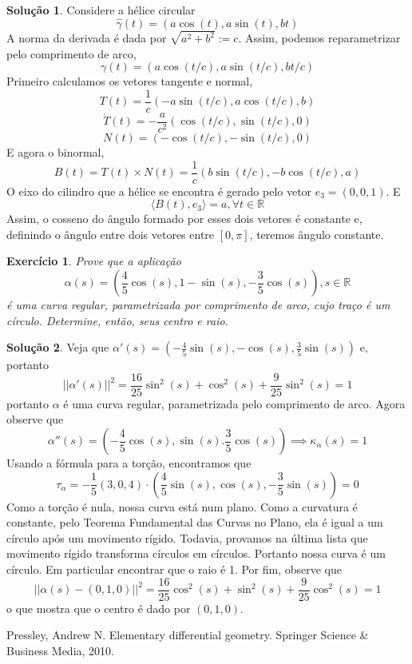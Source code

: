 \documentclass[a4paper,12pt]{article}
\newcommand{\R}{\mathbb{R}}
\theoremstyle{exer}
\newtheorem{exercise}{Exercício}
\theoremstyle{definition}
\newtheorem{solution}{Solução}
\theoremstyle{plain}
\begin{document}
\begin{solution}
    Considere a hélice circular 
    $$
    \hat{\gamma}(t) = (a\cos(t), a\sin(t), bt)
    $$
    A norma da derivada é dada por $\sqrt{a^2 + b^2} := c$. Assim, podemos
    reparametrizar pelo comprimento de arco, 
    $$
    \gamma(t) = (a\cos(t/c), a\sin(t/c), bt/c)
    $$
    Primeiro calculamos os vetores tangente e normal,
    $$
    T(t) = \frac{1}{c}(-a\sin(t/c), a\cos(t/c), b)
    $$
    $$
    \dot{T}(t) = -\frac{a}{c^2}(\cos(t/c), \sin(t/c), 0)
    $$
    $$
    N(t) =  (-\cos(t/c), -\sin(t/c), 0)
    $$
    E agora o binormal, 
    $$
    B(t) = T(t) \times N(t) = \frac{1}{c}(b\sin(t/c), -b\cos(t/c), a) 
    $$
    O eixo do cilindro que a hélice se encontra é gerado pelo vetor $e_3 =
    (0,0,1)$. E 
    $$
    \langle B(t), e_3 \rangle = a, \forall t \in \R 
    $$
    Assim, o cosseno do ângulo formado por esses dois vetores é constante e,
    definindo o ângulo entre dois vetores entre $[0,\pi]$, teremos ângulo
    constante. 
\end{solution}

\begin{exercise}
    Prove que a aplicação
    $$\alpha(s) = \left(\frac{4}{5}\cos(s), 1 - \sin(s), -\frac{3}{5}\cos(s)\right), s
    \in \R$$
    é uma curva regular, parametrizada por comprimento de arco, cujo traço é um círculo.
    Determine, então, seus centro e raio.
\end{exercise}

\begin{solution}
    Veja que $\alpha'(s) = \left(-\frac{4}{5}\sin(s), -\cos(s),
    \frac{3}{5}\sin(s)\right)$ e, portanto
    $$
    ||\alpha'(s)||^2 = \frac{16}{25}\sin^2(s) + \cos^2(s) + \frac{9}{25}\sin^2(s) = 1
    $$
    portanto $\alpha$ é uma curva regular, parametrizada pelo comprimento de
    arco. Agora observe que 
    $$
    \alpha''(s) = \left(-\frac{4}{5}\cos(s), \sin(s). \frac{3}{5}\cos(s)\right) \implies \kappa_{\alpha}(s) = 1
    $$
    Usando a fórmula para a torção, encontramos que 
    $$
    \tau_{\alpha} = -\frac{1}{5}(3,0,4)\cdot\left(\frac{4}{5}\sin(s), \cos(s), -\frac{3}{5}\sin(s)\right) = 0
    $$
    Como a torção é nula, nossa curva está num plano. Como a curvatura é
    constante, pelo Teorema Fundamental das Curvas no Plano, ela é igual a um
    círculo após um movimento rígido. Todavia, provamos na última lista que
    movimento rígido transforma círculos em círculos. Portanto nossa curva é
    um círculo. Em particular encontrar que o raio é 1. Por fim, observe que 
    $$
    ||\alpha(s) - (0,1,0)||^2 = \frac{16}{25}\cos^2(s) + \sin^2(s) + \frac{9}{25}\cos^2(s) = 1 
    $$
    o que mostra que o centro é dado por $(0,1,0)$. 
\end{solution}

\begin{thebibliography}{9}
    Pressley, Andrew N. Elementary differential geometry. Springer Science \& Business Media, 2010.
\end{thebibliography}
\end{document}
